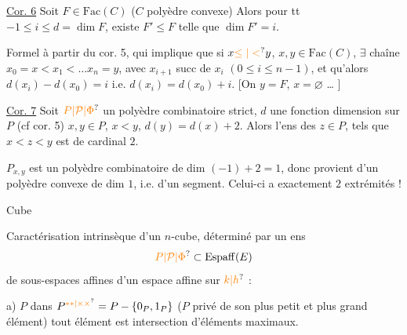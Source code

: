 \uline{Cor. 6} Soit $F\in\mathrm{Fac}(C)$ ($C$ polyèdre convexe)
Alors pour tt $-1\leq i\leq d=\dim F$, existe $F'\leq F$
telle que $\dim F'=i$.


Formel à partir du cor. 5, qui implique que
si $x\unsure{\leq|<} y$, $x,y\in\mathrm{Fac}(C)$,  $\exists$ chaîne
$x_0=x<x_1<\ldots x_n=y$, avec $x_{i+1}$ succ de $x_i$
$(0\leq i\leq n-1)$, et qu'alors 
 $d(x_i)-d(x_0)=i$ i.e. $d(x_i)=d(x_0)+i$.
[On  $y=F$, $x=\varnothing$ \ldots{} ]

\uline{Cor. 7} Soit $\unsure{P|\mathcal P|\Phi}$ un polyèdre combinatoire
strict, $d$ une fonction dimension sur $P$
(cf cor. 5)  $x,y\in P$, $x<y$,
$d(y)=d(x)+2$. Alors l'ens des $z\in P$,
tels que $x<z<y$ est de cardinal $2$.

$P_{x,y}$ est un polyèdre combinatoire  de
dim $(-1)+2=1$, donc provient d'un polyèdre
convexe de dim $1$, i.e. d'un segment. Celui-ci a exactement $2$ extrémités !

 \hfill Cube

Caractérisation intrinsèque d'un $n$-cube, déterminé par un ens
\[
\unsure{P|\mathcal P|\Phi}\subset\mathrm{Espaff}(E)
\]
de sous-espaces affines d'un espace affine sur $\unsure{k|h}$ :

a) $P$ 
dans $P^{\unsure{**|\times\times}}=P-\{0_P,1_P\}$ ($P$ privé de son plus
petit et plus grand élément) tout élément est
intersection  d'éléments maximaux.

